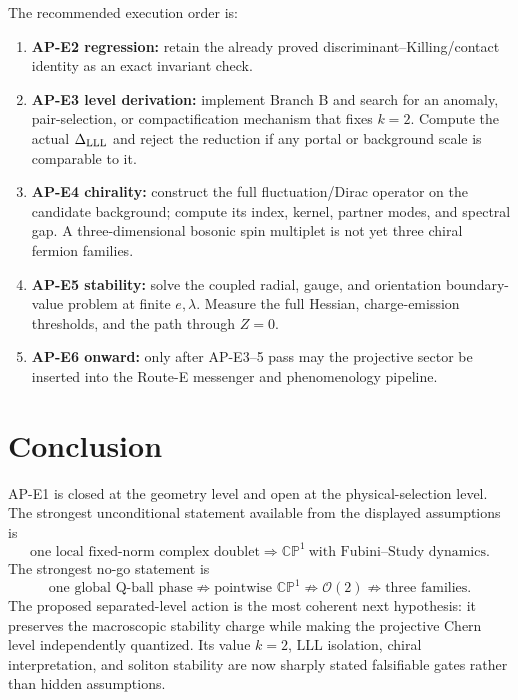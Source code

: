 \documentclass[11pt]{article}
\numberwithin{equation}{section}
\newcommand{\CP}{\mathbb{CP}}
\newcommand{\cO}{\mathcal O}
\begin{document}
The recommended execution order is:
\begin{enumerate}
\item \textbf{AP-E2 regression:} retain the already proved
discriminant--Killing/contact identity as an exact invariant check.
\item \textbf{AP-E3 level derivation:} implement Branch B and search for an
anomaly, pair-selection, or compactification mechanism that fixes \(k=2\).
Compute the actual \(\Delta_{\rm LLL}\) and reject the reduction if any portal
or background scale is comparable to it.
\item \textbf{AP-E4 chirality:} construct the full fluctuation/Dirac operator
on the candidate background; compute its index, kernel, partner modes, and
spectral gap.  A three-dimensional bosonic spin multiplet is not yet three
chiral fermion families.
\item \textbf{AP-E5 stability:} solve the coupled radial, gauge, and orientation
boundary-value problem at finite \(e,\lambda\).  Measure the full Hessian,
charge-emission thresholds, and the path through \(Z=0\).
\item \textbf{AP-E6 onward:} only after AP-E3--5 pass may the projective sector
be inserted into the Route-E messenger and phenomenology pipeline.
\end{enumerate}

\section{Conclusion}

AP-E1 is closed at the geometry level and open at the physical-selection
level.  The strongest unconditional statement available from the displayed
assumptions is
\begin{equation}
 \boxed{
 \text{one local fixed-norm complex doublet}
 \Longrightarrow \CP^1\ \text{with Fubini--Study dynamics}.}
\end{equation}
The strongest no-go statement is
\begin{equation}
 \boxed{
 \text{one global Q-ball phase}
 \not\Longrightarrow
 \text{pointwise }\CP^1\not\Longrightarrow\cO(2)
 \not\Longrightarrow\text{three families}.}
\end{equation}
The proposed separated-level action is the most coherent next hypothesis:
it preserves the macroscopic stability charge while making the projective
Chern level independently quantized.  Its value \(k=2\), LLL isolation,
chiral interpretation, and soliton stability are now sharply stated
falsifiable gates rather than hidden assumptions.



\end{document}

